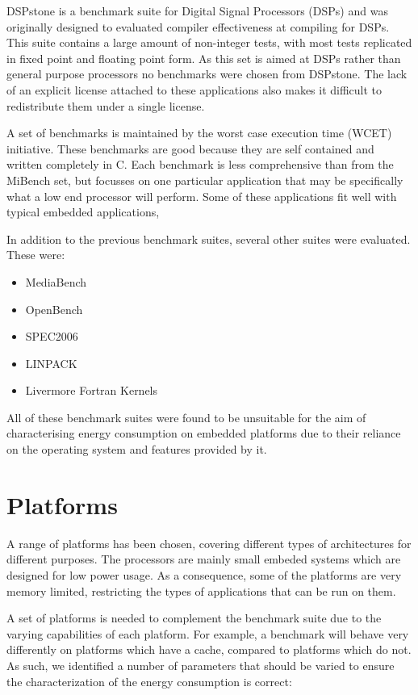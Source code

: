 \documentclass[twocolumn]{article}
\begin{document}
DSPstone\cite{Zivojnovic} is a benchmark suite for Digital Signal Processors (DSPs) and was originally designed to evaluated compiler effectiveness at compiling for DSPs. This suite contains a large amount of non-integer tests, with most tests replicated in fixed point and floating point form. As this set is aimed at DSPs rather than general purpose processors no benchmarks were chosen from DSPstone. The lack of an explicit license attached to these applications also makes it difficult to redistribute them under a single license.

A set of benchmarks is maintained by the worst case execution time (WCET) initiative\cite{Gustafsson2010}. These benchmarks are good because they are self contained and written completely in C. Each benchmark is less comprehensive than from the MiBench set, but focusses on one particular application that may be specifically what a low end processor will perform. Some of these applications fit well with typical embedded applications,

In addition to the previous benchmark suites, several other suites were evaluated. These were:
\begin{itemize}
	\setlength{\itemsep}{-0.25em}
	\item MediaBench
	\item OpenBench\cite{OpenBench}
	\item SPEC2006\cite{Henning2006}
	\item LINPACK
	\item Livermore Fortran Kernels
\end{itemize}

All of these benchmark suites were found to be unsuitable for the aim of characterising energy consumption on embedded platforms due to their reliance on the operating system and features provided by it.

\section{Platforms}

A range of platforms has been chosen, covering different types of architectures for different purposes. The processors are mainly small embeded systems which are designed for low power usage. As a consequence, some of the platforms are very memory limited, restricting the types of applications that can be run on them.

A set of platforms is needed to complement the benchmark suite due to the varying capabilities of each platform. For example, a benchmark will behave very differently on platforms which have a cache, compared to platforms which do not. As such, we identified a number of parameters that should be varied to ensure the characterization of the energy consumption is correct:
\end{document}
